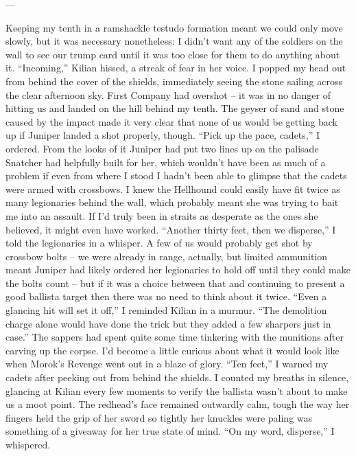 \documentclass[12pt, openany]{book}
\begin{document}
—

Keeping my tenth in a ramshackle testudo formation meant we could only move slowly, but it was necessary nonetheless: I didn’t want any of the soldiers on the wall to see our trump card until it was too close for them to do anything about it.
“Incoming,” Kilian hissed, a streak of fear in her voice.
I popped my head out from behind the cover of the shields, immediately seeing the stone sailing across the clear afternoon sky. First Company had overshot – it was in no danger of hitting us and landed on the hill behind my tenth. The geyser of sand and stone caused by the impact made it very clear that none of us would be getting back up if Juniper landed a shot properly, though.
“Pick up the pace, cadets,” I ordered.
From the looks of it Juniper had put two lines up on the palisade Snatcher had helpfully built for her, which wouldn’t have been as much of a problem if even from where I stood I hadn’t been able to glimpse that the cadets were armed with crossbows. I knew the Hellhound could easily have fit twice as many legionaries behind the wall, which probably meant she was trying to bait me into an assault. If I’d truly been in straits as desperate as the ones she believed, it might even have worked.
“Another thirty feet, then we disperse,” I told the legionaries in a whisper.
A few of us would probably get shot by crossbow bolts – we were already in range, actually, but limited ammunition meant Juniper had likely ordered her legionaries to hold off until they could make the bolts count – but if it was a choice between that and continuing to present a good ballista target then there was no need to think about it twice.
“Even a glancing hit will set it off,” I reminded Kilian in a murmur. “The demolition charge alone would have done the trick but they added a few sharpers just in case.”
The sappers had spent quite some time tinkering with the munitions after carving up the corpse. I’d become a little curious about what it would look like when Morok’s Revenge went out in a blaze of glory.
“Ten feet,” I warned my cadets after peeking out from behind the shields.
I counted my breaths in silence, glancing at Kilian every few moments to verify the ballista wasn’t about to make us a moot point. The redhead’s face remained outwardly calm, tough the way her fingers held the grip of her sword so tightly her knuckles were paling was something of a giveaway for her true state of mind.
“On my word, disperse,” I whispered.
\end{document}
